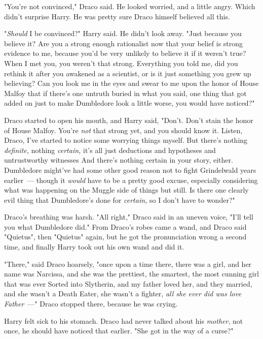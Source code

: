 "You're not convinced," Draco said. He looked worried, and a little angry.
Which didn't surprise Harry. He was pretty sure Draco himself believed all this.

"\emph{Should} I be convinced?" Harry said. He didn't look away. "Just because
you believe it? Are you a strong enough rationalist now that your belief is
strong evidence to me, because you'd be very unlikely to believe it if it
weren't true? When I met you, you weren't that strong. Everything you told me,
did you rethink it after you awakened as a scientist, or is it just something
you grew up believing? Can you look me in the eyes and swear to me upon the
honor of House Malfoy that if there's one untruth buried in what you said, one
thing that got added on just to make Dumbledore look a little worse, you would
have noticed?"

Draco started to open his mouth, and Harry said, "Don't. Don't stain the honor
of House Malfoy. You're \emph{not} that strong yet, and you should know it.
Listen, Draco, I've started to notice some worrying things myself. But there's
nothing \emph{definite,} nothing \emph{certain,} it's all just deductions and
hypotheses and untrustworthy witnesses{\el} And there's nothing certain in
your story, either. Dumbledore might've had some other good reason not to fight
Grindelwald years earlier~--- though it \emph{would} have to be a pretty good
excuse, especially considering what was happening on the Muggle side of
things{\el} but still. Is there one clearly evil thing that Dumbledore's
done for \emph{certain,} so I don't have to wonder?"

Draco's breathing was harsh. "All right," Draco said in an uneven voice, "I'll
tell you what Dumbledore did." From Draco's robes came a wand, and Draco said
"Quietus", then "Quietus" again, but he got the pronunciation wrong a second
time, and finally Harry took out his own wand and did it.

"There," said Draco hoarsely, "once upon a time there, there was a girl, and
her name was Narcissa, and she was the prettiest, the smartest, the most
cunning girl that was ever Sorted into Slytherin, and my father loved her, and
they married, and she wasn't a Death Eater, she wasn't a fighter, \emph{all she
ever did was love Father}~---" Draco stopped there, because he was crying.

Harry felt sick to his stomach. Draco had never talked about his \emph{mother},
not once, he should have noticed that earlier. "She{\el} got in the way of a
curse?"

